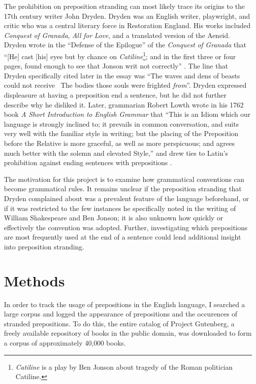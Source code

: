 \documentclass[DIV=calc, paper=letter, fontsize=12pt]{scrartcl}	 %
\begin{document}
\begin{multicols}{2}
The prohibition on preposition stranding can most likely trace its
origins to the 17th century writer John Dryden. Dryden was an English writer, playwright, and critic
who was a central literary force in Restoration England. His works included \emph{Conquest of Granada}, \emph{All for Love}, and a translated version of the Aeneid. Dryden wrote in the ``Defense of the Epilogue'' of the \emph{Conquest of Granada} that ``[He] cast [his] eyes but by chance on \emph{Catiline}\footnote{\emph{Catiline} is a play by Ben Jonson about tragedy of the Roman politician Catiline.}; and in the first three or four pages, found enough to see that Jonson writ not correctly'' \cite{Defense}. The line that Dryden specifically cited later in the essay was ``The waves and dens of beasts could not receive \ The bodies those souls were frighted \emph{from}''. Dryden expressed displeasure at having a preposition end a sentence, but he did not further describe why he disliked it. Later, grammarian Robert Lowth wrote in his 1762 book \emph{A Short Introduction to English Grammar} that ``This is an Idiom which our language is strongly inclined to; it prevails in common conversation, and suits very well with the familiar style in writing; but the placing of the Preposition before the Relative is more graceful, as well as more perspicuous; and agrees much better with the solemn and elevated Style,'' and drew ties to Latin's prohibition against ending sentences with prepositions \cite{Lowth}.

The motivation for this project is to examine how grammatical conventions can become 
grammatical rules. It remains unclear if the preposition stranding that Dryden complained about
was a prevalent feature of the language beforehand, or if it was restricted to the few instances he specifically noted in the writing of William Shakespeare and Ben Jonson; it is also unknown how quickly or effectively the convention was adopted. Further, investigating which prepositions are most frequently used at the end of a sentence could lend additional insight into preposition stranding. 


\section{Methods}

In order to track the usage of prepositions in the English language, I searched a large corpus and 
logged the appearance of prepositions and the occurences of stranded prepositions.
To do this, the entire catalog of Project Gutenberg, a freely available repository of books in the
public domain, was downloaded to form a corpus of approximately 40,000 books.


\end{multicols}
\end{document}
